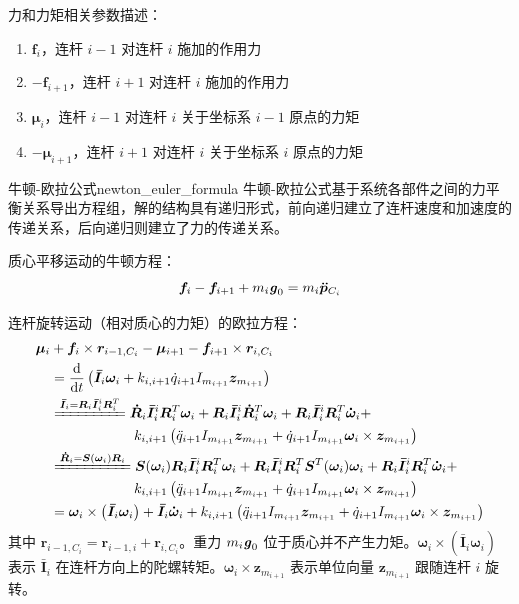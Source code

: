 \documentclass[cn,11pt,chinese,blue,bibstyle=ieeetr]{elegantbook}
\begin{document}
力和力矩相关参数描述：
\begin{enumerate}
	\item $\bm{f}_{i}$，连杆 $i-1$ 对连杆 $i$ 施加的作用力
	\item $-\bm{f}_{i+1}$，连杆 $i+1$ 对连杆 $i$ 施加的作用力
	\item $\bm{\mu}_{i}$，连杆 $i-1$ 对连杆 $i$ 关于坐标系 $i-1$ 原点的力矩
	\item $-\bm{\mu}_{i+1}$，连杆 $i+1$ 对连杆 $i$ 关于坐标系 $i$ 原点的力矩
\end{enumerate}

\begin{definition}{牛顿-欧拉公式}{newton_euler_formula}
牛顿-欧拉公式基于系统各部件之间的力平衡关系导出方程组，解的结构具有递归形式，前向递归建立了连杆速度和加速度的传递关系，后向递归则建立了力的传递关系。

质心平移运动的牛顿方程：
\begin{equation}\label{translational_motion_newton_equation}
\bm{f}_i - \bm{f}_{i+1} + m_i\textbf{\textit{g}}_0 = m_i\bm{\ddot{p}}_{C_i}
\end{equation}

连杆旋转运动（相对质心的力矩）的欧拉方程：
\begin{equation}\label{rotational_motion_euler_equation}
\begin{aligned}
\bm{\mu}_i &+ \bm{f}_i \times \bm{r}_{i-1,C_i} - \bm{\mu}_{i+1} - \bm{f}_{i+1} \times \bm{r}_{i,C_i} \\ &= \frac{\mathrm{d}}{\mathrm{d}t} \left(\bm{\bar{I}}_i\bm{\omega}_i + k_{i,i+1}\dot{q}_{i+1}I_{m_{i+1}}\bm{z}_{m_{i+1}}\right) \\
&\xlongequal{\bm{\bar{I}}_i = \bm{R}_i\bm{\bar{I}}_i^i\bm{R}_i^T} \bm{\dot{R}}_i\bm{\bar{I}}_i^i\bm{R}_i^T\bm{\omega}_i + \bm{R}_i\bm{\bar{I}}_i^i\bm{\dot{R}}_i^T\bm{\omega}_i + \bm{R}_i\bm{\bar{I}}_i^i\bm{R}_i^T\bm{\dot{\omega}}_i + \\
& \qquad \qquad \qquad k_{i,i+1}\left(\ddot{q}_{i+1}I_{m_{i+1}}\bm{z}_{m_{i+1}} + \dot{q}_{i+1}I_{m_{i+1}}\bm{\omega}_i\times\bm{z}_{m_{i+1}}\right) \\ 
&\xlongequal{\bm{\dot{R}}_i = \bm{S}(\bm{\omega}_i)\bm{R}_i} \bm{S}(\bm{\omega}_i)\bm{R}_i\bm{\bar{I}}_i^i\bm{R}_i^T\bm{\omega}_i + \bm{R}_i\bm{\bar{I}}_i^i\bm{R}_i^T\bm{S}^T(\bm{\omega}_i)\bm{\omega}_i + \bm{R}_i\bm{\bar{I}}_i^i\bm{R}_i^T\bm{\dot{\omega}}_i + \\
& \qquad \qquad \qquad k_{i,i+1}\left(\ddot{q}_{i+1}I_{m_{i+1}}\bm{z}_{m_{i+1}} + \dot{q}_{i+1}I_{m_{i+1}}\bm{\omega}_i\times\bm{z}_{m_{i+1}}\right) \\
&=\bm{\omega}_i\times\left(\bm{\bar{I}}_i\bm{\omega}_i\right) + \bm{\bar{I}}_i\bm{\dot{\omega}}_i + k_{i,i+1}\left(\ddot{q}_{i+1}I_{m_{i+1}}\bm{z}_{m_{i+1}} + \dot{q}_{i+1}I_{m_{i+1}}\bm{\omega}_i\times\bm{z}_{m_{i+1}}\right)
\end{aligned}
\end{equation}
其中 $\bm{r}_{i-1, C_i} = \bm{r}_{i-1,i} + \bm{r}_{i,C_i}$。重力 $m_i\textbf{\textit{g}}_0$ 位于质心并不产生力矩。$\bm{\omega}_i\times(\bm{\bar{I}}_i\bm{\omega}_i)$ 表示 $\bm{\bar{I}}_i$ 在连杆方向上的陀螺转矩。$\bm{\omega}_i\times\bm{z}_{m_{i+1}}$ 表示单位向量 $\bm{z}_{m_{i+1}}$ 跟随连杆 $i$ 旋转。
\end{definition}
\end{document}
